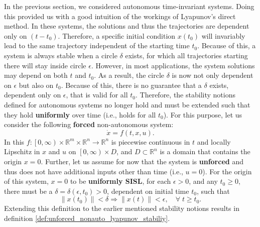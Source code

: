 In the previous section, we considered autonomous time-invariant systems. Doing this provided us with a good intuition of the workings of Lyapunov's direct method. In these systems, the solutions and thus the trajectories are dependent only on $\left(t - t _ 0\right)$. Therefore, a specific initial condition $x\left(t_0\right)$ will invariably lead to the same trajectory independent of the starting time $t_0$. Because of this, a system is always stable when a circle $\delta$ exists, for which all trajectories starting there will stay inside circle $\epsilon$. However, in most applications, the system solutions may depend on both $t$ and $t_0$. As a result, the circle $\delta$ is now not only dependent on $\epsilon$ but also on $t_0$. Because of this, there is no guarantee that a $\delta$ exists, dependent only on $\epsilon$, that is valid for all $t_0$. Therefore, the stability notions defined for autonomous systems no longer hold and must be extended such that they hold \textbf{uniformly} over time (i.e., holds for all $t_0$). For this purpose, let us consider the following \textbf{forced} non-autonomous system:
\begin{equation} \label{eq:unforced_nonlinear_system}
  \dot{ x }= f \left(t, x, u \right).
\end{equation}
In this $f : \left[0, \infty\right) \times \mathbb{R}^m \times \mathbb{R}^n \rightarrow \mathbb{R}^n$ is piecewise continuous in $t$ and locally Lipschitz in $x$ and $u$ on $\left[0 ,\infty\right)\times D$, and $D \subset \mathbb{R}^n$ is a domain that contains the origin $x = 0$. Further, let us assume for now that the system is \textbf{unforced} and thus does not have additional inputs other than time (i.e., $u=0$). For the origin of this system, $x=0$ to be \textbf{uniformly SISL}, for each $\epsilon > 0$, and any $t_0 \geq 0$, there must be a $\delta = \delta \left( \epsilon, t _ 0 \right)> 0$, dependent on initial time $t_0$, such that
\begin{equation}
  \left\| x\left(t_0\right)\right\| < \delta \Rightarrow \left\| x \left( t \right)\right\| < \epsilon, \quad \forall \; t\geq t_0.
\end{equation}
Extending this definition to the earlier mentioned stability notions results in definition \ref{def:unforced_nonauto_lyapunov_stabiliy}.
